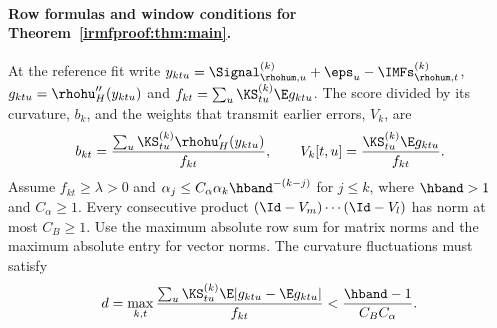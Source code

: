\paragraph{Row formulas and window conditions for Theorem~\ref{irmfproof:thm:main}.}
At the reference fit write \(y_{ktu}=\Signal_{\rhohum,u}^{(k)}+\eps_u-
\IMFs_{\rhohum,t}^{(k)}\), \(g_{ktu}=\rhohu_H''(y_{ktu})\) and
\(f_{kt}=\sum_u\KS_{tu}^{(k)}\E g_{ktu}\). The score divided by its
curvature, \(b_k\), and the weights that transmit earlier errors, \(V_k\), are
\begin{equation}\label{irmfproof:eq:row}
 b_{kt}=\frac{\sum_u\KS_{tu}^{(k)}\rhohu_H'(y_{ktu})}{f_{kt}},\qquad
 V_k[t,u]=\frac{\KS_{tu}^{(k)}\E g_{ktu}}{f_{kt}} .
\end{equation}
Assume \(f_{kt}\ge\lambda>0\) and
\(\alpha_j\le C_\alpha\alpha_k\hband^{-(k-j)}\) for \(j\le k\), where
\(\hband>1\) and \(C_\alpha\ge1\). Every consecutive product
\((\Id-V_m)\cdots(\Id-V_l)\) has norm at most \(C_B\ge1\).
Use the maximum absolute row sum for matrix norms and the maximum absolute
entry for vector norms. The curvature fluctuations must satisfy
\begin{equation}\label{irmfproof:eq:dispersion}
 d=\max_{k,t}\frac{\sum_u\KS_{tu}^{(k)}\E|g_{ktu}-\E g_{ktu}|}{f_{kt}}
 <\frac{\hband-1}{C_B C_\alpha} .
\end{equation}

